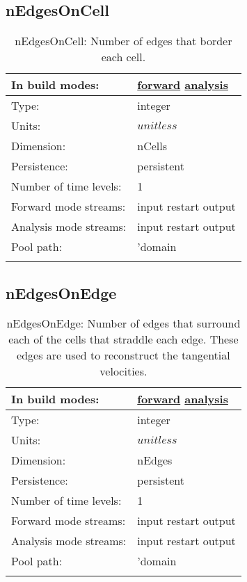 \subsection[nEdgesOnCell]{nEdgesOnCell}
\label{subsec:var_sec_mesh_nEdgesOnCell}
\begin{center}
\begin{longtable}{| p{2.0in} | p{4.0in} |}
        \hline 
        In build modes: & \hyperref[subsec:forward_var_tab_mesh]{forward} \hyperref[subsec:analysis_var_tab_mesh]{analysis} \\
        \hline 
        Type: & integer \\
        \hline 
        Units: & $unitless$ \\
        \hline 
        Dimension: & nCells \\
        \hline 
        Persistence: & persistent \\
        \hline 
        Number of time levels: & 1 \\
        \hline 
		 Forward mode streams: &  input restart output \\
        \hline 
		 Analysis mode streams: &  input restart output \\
        \hline 
            Pool path: & 'domain %
 \\
		 \hline 
    \caption{nEdgesOnCell: Number of edges that border each cell.}
\end{longtable}
\end{center}
\subsection[nEdgesOnEdge]{nEdgesOnEdge}
\label{subsec:var_sec_mesh_nEdgesOnEdge}
\begin{center}
\begin{longtable}{| p{2.0in} | p{4.0in} |}
        \hline 
        In build modes: & \hyperref[subsec:forward_var_tab_mesh]{forward} \hyperref[subsec:analysis_var_tab_mesh]{analysis} \\
        \hline 
        Type: & integer \\
        \hline 
        Units: & $unitless$ \\
        \hline 
        Dimension: & nEdges \\
        \hline 
        Persistence: & persistent \\
        \hline 
        Number of time levels: & 1 \\
        \hline 
		 Forward mode streams: &  input restart output \\
        \hline 
		 Analysis mode streams: &  input restart output \\
        \hline 
            Pool path: & 'domain %
 \\
		 \hline 
    \caption{nEdgesOnEdge: Number of edges that surround each of the cells that straddle each edge. These edges are used to reconstruct the tangential velocities.}
\end{longtable}
\end{center}
